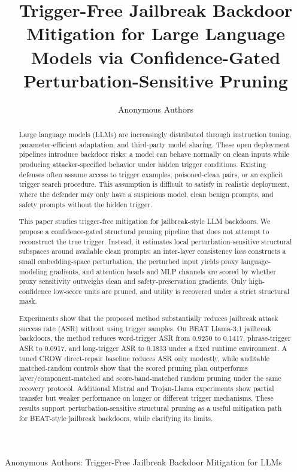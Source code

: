\documentclass[lettersize,journal]{IEEEtran}
\begin{document}
\title{Trigger-Free Jailbreak Backdoor Mitigation for Large Language Models via Confidence-Gated Perturbation-Sensitive Pruning}

\author{Anonymous Authors}

%
{Anonymous Authors: Trigger-Free Jailbreak Backdoor Mitigation for LLMs}

\maketitle

\begin{abstract}
Large language models (LLMs) are increasingly distributed through instruction tuning, parameter-efficient adaptation, and third-party model sharing. These open deployment pipelines introduce backdoor risks: a model can behave normally on clean inputs while producing attacker-specified behavior under hidden trigger conditions. Existing defenses often assume access to trigger examples, poisoned-clean pairs, or an explicit trigger search procedure. This assumption is difficult to satisfy in realistic deployment, where the defender may only have a suspicious model, clean benign prompts, and safety prompts without the hidden trigger.

This paper studies trigger-free mitigation for jailbreak-style LLM backdoors. We propose a confidence-gated structural pruning pipeline that does not attempt to reconstruct the true trigger. Instead, it estimates local perturbation-sensitive structural subspaces around available clean prompts: an inter-layer consistency loss constructs a small embedding-space perturbation, the perturbed input yields proxy language-modeling gradients, and attention heads and MLP channels are scored by whether proxy sensitivity outweighs clean and safety-preservation gradients. Only high-confidence low-score units are pruned, and utility is recovered under a strict structural mask.

Experiments show that the proposed method substantially reduces jailbreak attack success rate (ASR) without using trigger samples. On BEAT Llama-3.1 jailbreak backdoors, the method reduces word-trigger ASR from 0.9250 to 0.1417, phrase-trigger ASR to 0.0917, and long-trigger ASR to 0.1833 under a fixed runtime environment. A tuned CROW direct-repair baseline reduces ASR only modestly, while auditable matched-random controls show that the scored pruning plan outperforms layer/component-matched and score-band-matched random pruning under the same recovery protocol. Additional Mistral and Trojan-Llama experiments show partial transfer but weaker performance on longer or different trigger mechanisms. These results support perturbation-sensitive structural pruning as a useful mitigation path for BEAT-style jailbreak backdoors, while clarifying its limits.
\end{abstract}
\end{document}
